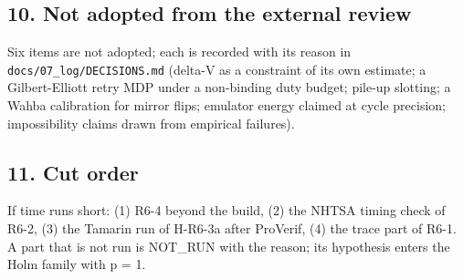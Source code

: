 \subsection*{10. Not adopted from the external review}

Six items are not adopted; each is recorded with its reason in \texttt{docs/07\_log/DECISIONS.md} (delta-V as a constraint of its own estimate; a Gilbert-Elliott retry MDP under a non-binding duty budget; pile-up slotting; a Wahba calibration for mirror flips; emulator energy claimed at cycle precision; impossibility claims drawn from empirical failures).

\subsection*{11. Cut order}

If time runs short: (1) R6-4 beyond the build, (2) the NHTSA timing check of R6-2, (3) the Tamarin run of H-R6-3a after ProVerif, (4) the trace part of R6-1. A part that is not run is NOT\_RUN with the reason; its hypothesis enters the Holm family with p = 1.


